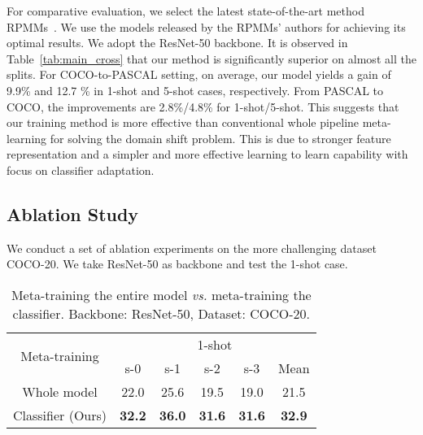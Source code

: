 \documentclass[10pt,twocolumn,letterpaper]{article}
\begin{document}
For comparative evaluation, we select the latest state-of-the-art method RPMMs~\cite{yang2020prototype}.
We use the models released by the RPMMs' authors for achieving its optimal results. 
We adopt the ResNet-50 backbone.
It is observed in Table~\ref{tab:main_cross} that our method is significantly superior on almost all the splits. For COCO-to-PASCAL setting, on average, our model yields a gain of 9.9\% and 12.7 \% in 1-shot and 5-shot cases, respectively.
From PASCAL to COCO, the improvements are 2.8\%/4.8\% for 1-shot/5-shot.
This suggests that our training method is more effective 
than conventional whole pipeline meta-learning for solving
the domain shift problem.
This is due to stronger feature representation
and a simpler and more effective learning to learn capability with focus on 
classifier adaptation.




\subsection{Ablation Study}
\label{sec:ablation}

We conduct a set of ablation experiments 
on the more challenging dataset COCO-20.
We take ResNet-50 as backbone and test the 1-shot case.



\begin{table}[]
    \centering
    \begin{tabular}{c|ccccc}
    \hline
         \multirow{2}{*}{Meta-training} & \multicolumn{5}{c}{1-shot}  \\
         \cline{2-6}
          & s-0 & s-1 & s-2 & s-3 & Mean \\
         \hline
         Whole model & 22.0 & 25.6 & 19.5 & 19.0 & 21.5 \\
         Classifier (Ours) & \textbf{32.2} & \textbf{36.0} & \textbf{31.6} & \textbf{31.6} & \textbf{32.9} \\
         \hline
    \end{tabular}
    \vspace{2pt}
    \caption{
    Meta-training the entire model {\em vs.} meta-training the classifier.
Backbone: ResNet-50,
    Dataset: COCO-20.
    }
    \label{tab:whole_model}
\end{table}

\vspace{-0.3cm}
\end{document}
